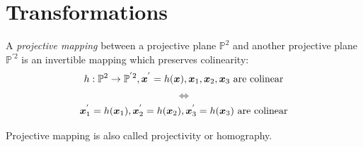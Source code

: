 \documentclass[12pt, a4paper]{report}
\newtheorem[style=M,bodystyle=\normalfont]{theorem}{Theorem}
\newtheorem[style=M,bodystyle=\normalfont]{corollary}{Corollary}
\newtheorem[style=M,bodystyle=\normalfont]{lemma}{Lemma}
\newtheorem[style=M,bodystyle=\normalfont]{definition}{Definition}
\begin{document}
    \section{Transformations}
    \begin{definition}
        A \emph{projective mapping} between a projective plane $\mathbb{P}^2$ and another projective plane $\mathbb{P}^{'2}$ is an invertible mapping which preserves colinearity:
        \[h:\mathbb{P}^2 \rightarrow \mathbb{P}^{'2}, \boldsymbol{x}^{'}=h(\boldsymbol{x}),\boldsymbol{x}_1,\boldsymbol{x}_2,\boldsymbol{x}_3 \textnormal{ are colinear}\]
        \[\Leftrightarrow\]
        \[\boldsymbol{x}_1^{'}=h(\boldsymbol{x}_1),\boldsymbol{x}_2^{'}=h(\boldsymbol{x}_2),\boldsymbol{x}_3^{'}=h(\boldsymbol{x}_3) \textnormal{ are colinear}\]
    \end{definition}
    Projective mapping is also called projectivity or homography. 
\end{document}
